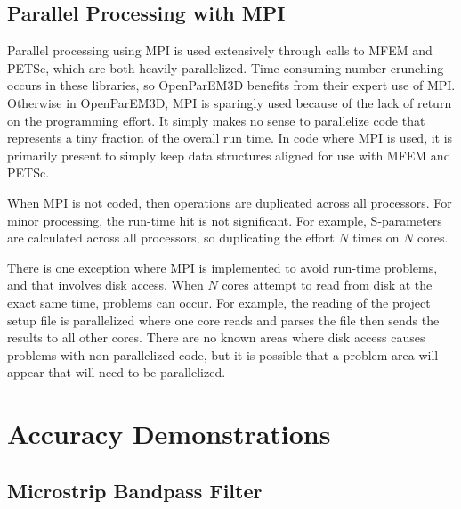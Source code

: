 \documentclass[titlepage]{article}
\renewcommand\_{\textunderscore\linebreak[1]}
\begin{document}
\subsection{Parallel Processing with MPI}

Parallel processing using MPI is used extensively through calls to MFEM and PETSc, which are both heavily parallelized.  Time-consuming number crunching occurs in these libraries, so OpenParEM3D benefits from their expert use of MPI.  Otherwise in OpenParEM3D, MPI is sparingly used because of the lack of return on the programming effort.  It simply makes no sense to parallelize code that represents a tiny fraction of the overall run time. In code where MPI is used, it is primarily present to simply keep data structures aligned for use with MFEM and PETSc.

When MPI is not coded, then operations are duplicated across all processors.  For minor processing, the run-time hit is not significant.  For example, S-parameters are calculated across all processors, so duplicating the effort $N$ times on $N$ cores.

There is one exception where MPI is implemented to avoid run-time problems, and that involves disk access.  When $N$ cores attempt to read from disk at the exact same time, problems can occur.  For example, the reading of the project setup file is parallelized where one core reads and parses the file then sends the results to all other cores.  There are no known areas where disk access causes problems with non-parallelized code, but it is possible that a problem area will appear that will need to be parallelized.

\section{Accuracy Demonstrations}
\label{sec:accuracy}

\subsection{Microstrip Bandpass Filter}
\end{document}
